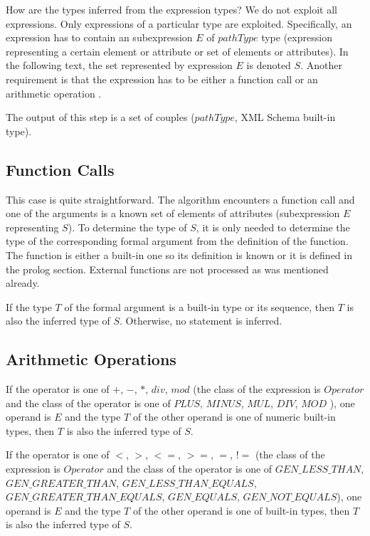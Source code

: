 How are the types inferred from the expression types? We do not exploit all expressions. Only expressions of a particular type are exploited. Specifically, an expression has to contain an subexpression $E$ of $pathType$ type (expression representing a certain element or attribute or set of elements or attributes). In the following text, the set represented by expression $E$ is denoted $S$. Another requirement is that the expression has to be either a function call or an arithmetic operation .

The output of this step is a set of couples ($pathType$, XML Schema built-in type).


\subsection{Function Calls}
This case is quite straightforward. The algorithm encounters a function call and one of the arguments is a known set of elements of attributes (subexpression $E$ representing $S$). To determine the type of $S$, it is only needed to determine the type of the corresponding formal argument from the definition of the function. The function is either a built-in one so its definition is known or it is defined in the prolog section. External functions are not processed as was mentioned already.

If the type $T$ of the formal argument is a built-in type or its sequence, then $T$ is also the inferred type of $S$. Otherwise, no statement is inferred.

\subsection{Arithmetic Operations}
If the operator is one of $+$, $-$, $*$, $div$, $mod$ (the class of the expression is $Operator$ and the class of the operator is one of $PLUS$, $MINUS$, $MUL$, $DIV$, $MOD$ ), one operand is $E$ and the type $T$ of the other operand is one of numeric built-in types, then $T$ is also the inferred type of $S$.

If the operator is one of $<$, $>$, $<=$, $>=$, $=$, $!=$ (the class of the expression is $Operator$ and the class of the operator is one of $GEN\_LESS\_THAN$, $GEN\_GREATER\_THAN$, $GEN\_LESS\_THAN\_EQUALS$, $GEN\_GREATER\_THAN\_EQUALS$, $GEN\_EQUALS$, $GEN\_NOT\_EQUALS$), one operand is $E$ and the type $T$ of the other operand is one of built-in types, then $T$ is also the inferred type of $S$.

